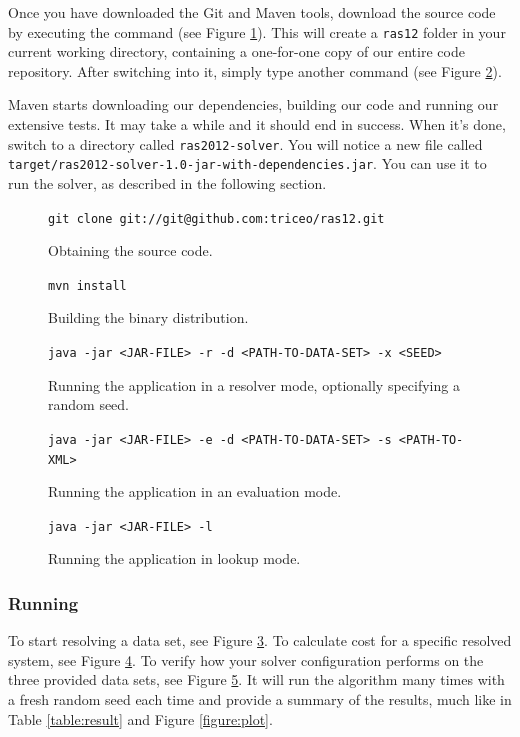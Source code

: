 \documentclass[10pt,a4paper,final]{article}
\begin{document}
Once you have downloaded the Git and Maven tools, download the source code by executing the command (see Figure \ref{figure:git}). This will create a \texttt{ras12} folder in your current working directory, containing a one-for-one copy of our entire code repository. After switching into it, simply type another command (see Figure \ref{figure:maven}).

Maven starts downloading our dependencies, building our code and running our extensive tests. It may take a while and it should end in success. When it's done, switch to a directory called \texttt{ras2012-solver}. You will notice a new file called \texttt{target/ras2012-solver-1.0-jar-with-dependencies.jar}. You can use it to run the solver, as described in the following section.

\begin{figure}
\centering
\texttt{git clone git://git@github.com:triceo/ras12.git}
\caption{Obtaining the source code.}
\label{figure:git}
\end{figure}

\begin{figure}
\centering
\texttt{mvn install}
\caption{Building the binary distribution.}
\label{figure:maven}
\end{figure}

\begin{figure}
\centering
\texttt{java -jar <JAR-FILE> -r -d <PATH-TO-DATA-SET> -x <SEED>}
\caption{Running the application in a resolver mode, optionally specifying a random seed.}
\label{figure:run-resolver}
\end{figure}

\begin{figure}
\centering
\texttt{java -jar <JAR-FILE> -e -d <PATH-TO-DATA-SET> -s <PATH-TO-XML>}
\caption{Running the application in an evaluation mode.}
\label{figure:run-evaluation}
\end{figure}

\begin{figure}
\centering
\texttt{java -jar <JAR-FILE> -l}
\caption{Running the application in lookup mode.}
\label{figure:run-lookup}
\end{figure}

\subsubsection{Running}

To start resolving a data set, see Figure \ref{figure:run-resolver}. To calculate cost for a specific resolved system, see Figure \ref{figure:run-evaluation}. To verify how your solver configuration performs on the three provided data sets, see Figure \ref{figure:run-lookup}. It will run the algorithm many times with a fresh random seed each time and provide a summary of the results, much like in Table \ref{table:result} and Figure \ref{figure:plot}.
\end{document}
